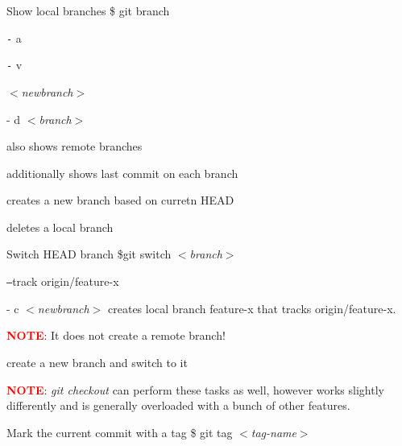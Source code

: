 \documentclass[twocolumn]{article}
\begin{document}
\begin{tcolorbox}[ titleBox, title=BRANCHES \& TAGS]
\begin{tcolorbox}[innerBox]
Show local branches
\tcblower
\$ git branch
\end{tcolorbox}
\begin{tcolorbox}[splitBox, lefthand ratio=0.30, fontupper = \small, fontlower = \small]
\texttt{-} a 
\vspace{4mm}

\texttt{-} v
\vspace{4mm}

$<$\textit{newbranch}$>$
\vspace{1mm}

- d $<$\textit{branch}$>$

\tcblower
also shows remote branches
\par\vspace{3mm}
additionally shows last commit on each branch
\par\vspace{3mm}
creates a new branch based on curretn HEAD
\par\vspace{2mm}
deletes a local branch

\end{tcolorbox}

\begin{tcolorbox}[innerBox]
Switch HEAD branch
\tcblower
\$git switch $<$\textit{branch}$>$
\end{tcolorbox}

\begin{tcolorbox}[splitBox, lefthand ratio=0.38, fontupper = \small, fontlower = \small]
\texttt{--}track origin/feature-x 
\vspace{9mm}

- c $<$\textit{newbranch}$>$
\tcblower
creates local branch feature-x that tracks origin/feature-x. \par\textcolor{red}{\textbf{NOTE}}: It does not create a remote branch!
\par\vspace{3mm}
create a new branch and switch to it

\end{tcolorbox}
\begin{tcolorbox}[    
    colback=white,
    colframe=orange,
    ]
        \textcolor{red}{\textbf{NOTE}}: \textit{git checkout} can perform these tasks as well, however works slightly differently and is generally overloaded with a bunch of other features.
\end{tcolorbox}

\begin{tcolorbox}[innerBox]
Mark the current commit with a tag
\tcblower
\$ git tag $<$\textit{tag-name}$>$
\end{tcolorbox}
\end{tcolorbox}
\end{document}
